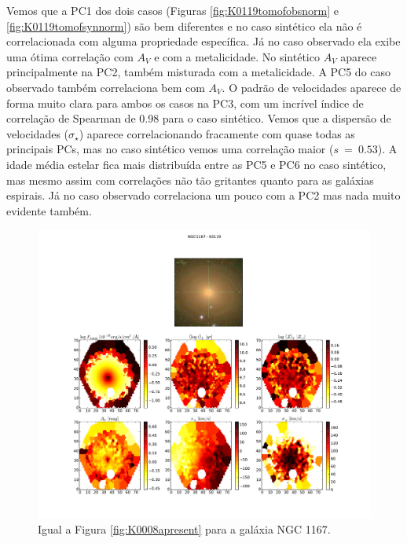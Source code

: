 Vemos que a PC1 dos dois casos (Figuras \ref{fig:K0119tomofobsnorm} e \ref{fig:K0119tomofsynnorm}) são bem diferentes e
no caso sintético ela não é correlacionada com alguma propriedade específica. Já no caso observado ela exibe uma ótima
correlação com $A_V$ e com a metalicidade. No sintético $A_V$ aparece principalmente na PC2, também misturada com a
metalicidade. A PC5 do caso observado também correlaciona bem com $A_V$. O padrão de velocidades aparece de forma muito
clara para ambos os casos na PC3, com um incrível índice de correlação de Spearman de 0.98 para o caso sintético. Vemos
que a dispersão de velocidades ($\sigma_\star$) aparece correlacionando fracamente com quase todas as principais PCs,
mas no caso sintético vemos uma correlação maior ($s\ =\ 0.53$). A idade média estelar fica mais distribuída entre as
PC5 e PC6 no caso sintético, mas mesmo assim com correlações não tão gritantes quanto para as galáxias espirais. Já no
caso observado correlaciona um pouco com a PC2 mas nada muito evidente também.

\begin{figure}
    \includegraphics[width=1.\textwidth]{figuras/K0119-apresent.pdf}
    \caption[Propriedades f\'isicas da gal\'axia NGC 1167.]
    {Igual a Figura \ref{fig:K0008apresent} para a galáxia NGC 1167.}
    \label{fig:K0119apresent}
\end{figure}

